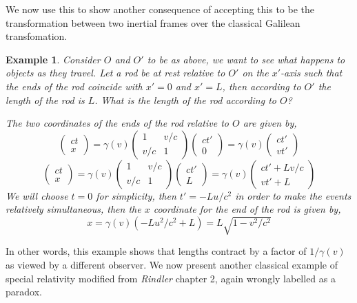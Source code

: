 \documentclass[a4paper,12pt,draft]{report}
\newtheorem{example}{Example}
\begin{document}
We now use this to show another consequence of accepting this to be the transformation between two inertial frames over the classical Galilean transfomation.

\begin{example}
Consider $O$ and $O'$ to be as above, we want to see what happens to objects as they travel. Let a rod be at rest relative to $O'$ on the $x'$-axis such that the ends of the rod coincide with $x' = 0$ and $x' = L$, then according to $O'$ the length of the rod is $L$. What is the length of the rod according to $O$?

The two coordinates of the ends of the rod relative to $O$ are given by,
$$
\begin{pmatrix}ct\\x\end{pmatrix} = \gamma(v)
\begin{pmatrix}
1 & v/c\\
v/c & 1
\end{pmatrix}
\begin{pmatrix}ct'\\0\end{pmatrix}
= \gamma(v)\begin{pmatrix}ct'\\vt'\end{pmatrix}
$$
$$
\begin{pmatrix}ct\\x\end{pmatrix} = \gamma(v)
\begin{pmatrix}
1 & v/c\\
v/c & 1
\end{pmatrix}
\begin{pmatrix}ct'\\L\end{pmatrix}
= \gamma(v)\begin{pmatrix}ct' + Lv/c\\vt' + L\end{pmatrix}
$$
We will choose $t = 0$ for simplicity, then $t' = -Lu/c^2$ in order to make the events relatively simultaneous, then the $x$ coordinate for the end of the rod is given by,
$$
x = \gamma(v)\left(-Lu^2/c^2 + L\right) = L\sqrt{1 - v^2/c^2}
$$
\end{example}
In other words, this example shows that lengths contract by a factor of $1/\gamma(v)$ as viewed by a different observer. We now present another classical example of special relativity modified from \emph{Rindler} \cite{WR} chapter 2, again wrongly labelled as a paradox.
\end{document}
